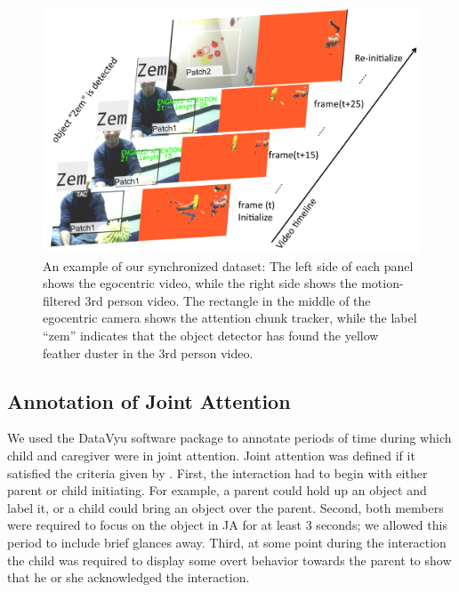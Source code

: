 \documentclass[10pt,letterpaper]{article}
\begin{document}
\begin{figure}[t]
     \begin{center}
           \includegraphics[width=1\linewidth]{Image/cogsci} 
          \end{center}
    \caption{An example of our synchronized dataset: The left side of each panel shows the egocentric video, while the right side shows the motion-filtered 3rd person video. The rectangle in the middle of the egocentric camera shows the attention chunk tracker, while the label ``zem'' indicates that the object detector has found the yellow feather duster in the 3rd person video.}
   \label{fig:main}
\end{figure}

\subsection{Annotation of Joint Attention}

We used the DataVyu software package \cite{adolph2012} to annotate periods of time during which child and caregiver were in joint attention. Joint attention was defined if it satisfied the criteria given by \cite{tomasello1986}. First, the interaction had to begin with either parent or child initiating. For example, a parent could hold up an object and label it, or a child could bring an object over the parent. Second, both members were required to focus on the object in JA for at least 3 seconds; we allowed this period to include brief glances away. Third, at some point during the interaction the child was required to display some overt behavior towards the parent to show that he or she acknowledged the interaction.
\end{document}
